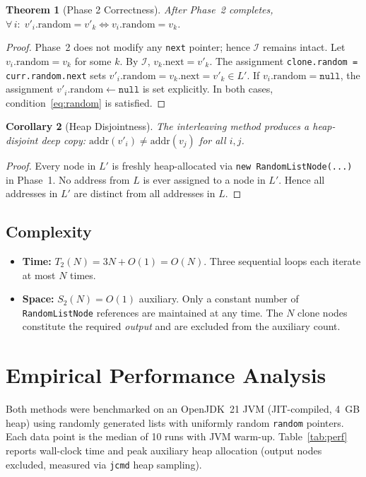 \documentclass[10pt,journal,compsoc]{IEEEtran}
\newtheorem{theorem}{Theorem}
\newtheorem{corollary}[theorem]{Corollary}
\begin{document}
\begin{theorem}[Phase 2 Correctness]
After Phase~2 completes, $\forall\,i:\; v'_i.\mathrm{random} = v'_k \iff v_i.\mathrm{random} = v_k$.
\end{theorem}

\begin{proof}
Phase~2 does not modify any \texttt{next} pointer; hence $\mathcal{I}$ remains intact. Let $v_i.\mathrm{random} = v_k$ for some $k$. By $\mathcal{I}$, $v_k.\mathrm{next} = v'_k$. The assignment \texttt{clone.random = curr.random.next} sets $v'_i.\mathrm{random} = v_k.\mathrm{next} = v'_k \in L'$. If $v_i.\mathrm{random} = \mathtt{null}$, the assignment $v'_i.\mathrm{random} \leftarrow \mathtt{null}$ is set explicitly. In both cases, condition~\eqref{eq:random} is satisfied.
\end{proof}

\begin{corollary}[Heap Disjointness]
The interleaving method produces a heap-disjoint deep copy: $\mathrm{addr}(v'_i) \neq \mathrm{addr}(v_j)$ for all $i, j$.
\end{corollary}

\begin{proof}
Every node in $L'$ is freshly heap-allocated via \texttt{new RandomListNode(...)} in Phase~1. No address from $L$ is ever assigned to a node in $L'$. Hence all addresses in $L'$ are distinct from all addresses in $L$.
\end{proof}

\subsection{Complexity}
\begin{itemize}
  \item \textbf{Time:} $T_2(N) = 3N + O(1) = O(N)$. Three sequential loops each iterate at most $N$ times.
  \item \textbf{Space:} $S_2(N) = O(1)$ auxiliary. Only a constant number of \texttt{RandomListNode} references are maintained at any time. The $N$ clone nodes constitute the required \textit{output} and are excluded from the auxiliary count.
\end{itemize}

\section{Empirical Performance Analysis}
\label{sec:perf}

Both methods were benchmarked on an OpenJDK~21 JVM (JIT-compiled, 4~GB heap) using randomly generated lists with uniformly random \texttt{random} pointers. Each data point is the median of 10 runs with JVM warm-up. Table~\ref{tab:perf} reports wall-clock time and peak auxiliary heap allocation (output nodes excluded, measured via \texttt{jcmd} heap sampling).
\end{document}
